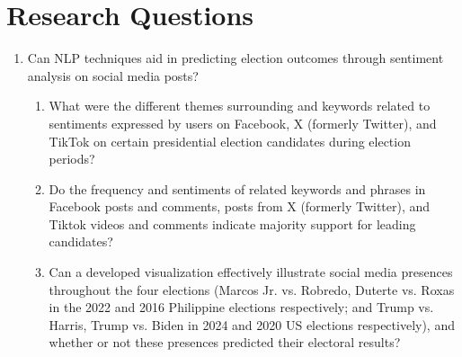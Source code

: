 \section{Research Questions}

\begin{enumerate}
    \item Can NLP techniques aid in predicting election outcomes through sentiment analysis on social media posts?
    \begin{enumerate}
        \item What were the different themes surrounding and keywords related to sentiments expressed by users on Facebook, X (formerly Twitter), and TikTok on certain presidential election candidates during election periods?
        \item Do the frequency and sentiments of related keywords and phrases in Facebook posts and comments, posts from X (formerly Twitter), and Tiktok videos and comments indicate majority support for leading candidates?
        \item Can a developed visualization effectively illustrate social media presences throughout the four elections (Marcos Jr. vs. Robredo, Duterte vs. Roxas in the 2022 and 2016 Philippine elections respectively; and Trump vs. Harris, Trump vs. Biden in 2024 and 2020 US elections respectively), and whether or not these presences predicted their electoral results?
    \end{enumerate}
\end{enumerate}